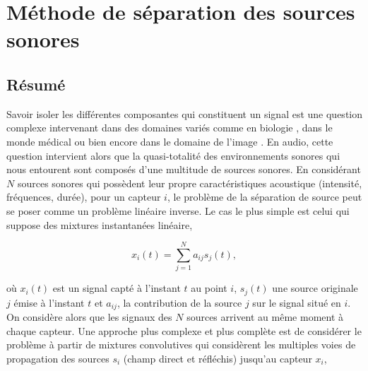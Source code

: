 \chapter{Méthode de séparation des sources sonores}
\label{chap:methode_separation_source}


\section*{\centering Résumé}


\vspace{2cm}

Savoir isoler les différentes composantes qui constituent un signal est une question complexe intervenant dans des domaines variés comme en biologie \cite{chiappetta2004blind}, dans le monde médical \cite{jung2000removing} ou bien encore dans le domaine de l'image \cite{nuzillard2000blind}. En audio, cette question intervient alors que la quasi-totalité des environnements sonores qui nous entourent sont composés d'une multitude de sources sonores. En considérant $N$ sources sonores qui possèdent leur propre caractéristiques acoustique (intensité, fréquences, durée), pour un capteur $i$, le problème de la séparation de source peut se poser comme un problème linéaire inverse. Le cas le plus simple est celui qui suppose des mixtures instantanées linéaire, 

\begin{equation}
x_i(t) = \sum_{j = 1}^{N} a_{ij}s_j(t),
\end{equation}

où $x_i(t)$ est un signal capté à l'instant $t$ au point $i$, $s_j(t)$ une source originale $j$ émise à l'instant $t$ et $a_{ij}$, la contribution de la source $j$ sur le signal situé en $i$. On considère alors que les signaux des $N$ sources arrivent au même moment à chaque capteur. Une approche plus complexe et plus complète est de considérer le problème à partir de mixtures convolutives qui considèrent les multiples voies de propagation des sources $s_i$ (champ direct et réfléchis) jusqu'au capteur $x_i$,  

